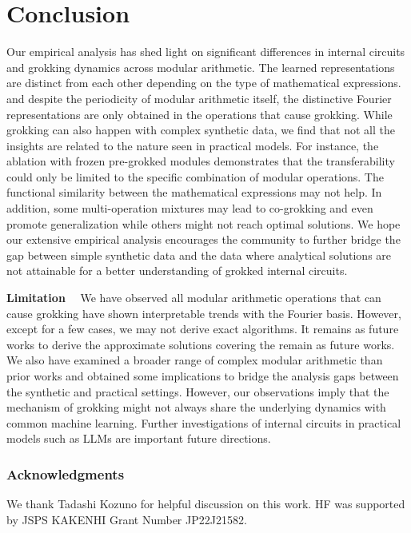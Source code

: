 \documentclass[10pt]{article} %
\newcommand{\update}[1]{{\color{black}{#1}}}
\begin{document}
\section{Conclusion}
Our empirical analysis has shed light on significant differences in internal circuits and grokking dynamics across modular arithmetic.
The learned representations are distinct from each other depending on the type of mathematical expressions. and despite the periodicity of modular arithmetic itself, the distinctive Fourier representations are only obtained in the operations that cause grokking. 
While grokking can also happen with complex synthetic data, we find that not all the insights are related to the nature seen in practical models.
For instance, the ablation with frozen pre-grokked modules demonstrates that the transferability could only be limited to the specific combination of modular operations.
The functional similarity between the mathematical expressions may not help.
In addition, some multi-operation mixtures may lead to co-grokking and even promote generalization while others might not reach optimal solutions.
We hope our extensive empirical analysis encourages the community to further bridge the gap between simple synthetic data and the data where analytical solutions are not attainable for a better understanding of grokked internal circuits.

\textbf{Limitation}~~
We have observed all modular arithmetic operations that can cause grokking have shown interpretable trends with the Fourier basis. However, except for a few cases, we may not derive exact algorithms.
It remains as future works to derive the approximate solutions covering the \update{other modular operations beyond addition} remain as future works.
We also have examined a broader range of complex modular arithmetic than prior works and obtained some implications to bridge the analysis gaps between the synthetic and practical settings. 
However, our observations imply that the mechanism of grokking might not always share the underlying dynamics with common machine learning.
Further investigations of internal circuits in practical models such as LLMs are important future directions.


\subsubsection*{Acknowledgments}
We thank Tadashi Kozuno for helpful discussion on this work. HF was supported by JSPS KAKENHI Grant Number JP22J21582.




\clearpage

\end{document}
